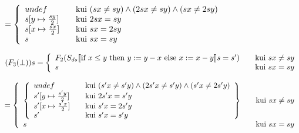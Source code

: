 \(
= 
\left\{
  \begin{array}{l l}
  undef                & \quad \text{kui}\ (sx \neq sy) \wedge (2sx \neq sy) \wedge (sx \neq 2sy)\\
  s[y \mapsto \frac{sy}{2} ] & \quad \text{kui}\ 2sx = sy \\
  s[x \mapsto \frac{sx}{2} ] & \quad \text{kui}\ sx = 2sy \\
  s                    & \quad \text{kui}\ sx = sy\\
  \end{array}
\right.
\)


\(
(F_3(\bot)) s = \left\{
    \begin{array}{l l}
    F_2(
      S_{ds} \llbracket
        \text{if\ } x \leq y
        \text{\ then\ } y := y - x \text{\ else\ } x := x - y
      \rrbracket s = s'
    ) & \quad \text{kui}\ sx \neq sy \\
    s & \quad \text{kui}\ sx = sy\\
  \end{array}
  \right.
\)

\(
=
\left\{
  \begin{array}{l l}
    \left \{ \begin{array}{l l}
      undef & \quad \text{kui}\ (s'x \neq s'y) \wedge (2s'x \neq s'y) \wedge (s'x \neq 2s'y)\\
      s'[y \mapsto \frac{s'y}{2} ] & \quad \text{kui}\ 2s'x = s'y \\
      s'[x \mapsto \frac{s'x}{2} ] & \quad \text{kui}\ s'x = 2s'y \\
      s'                    & \quad \text{kui}\ s'x = s'y\\
    \end{array} \right \} & \quad \text{kui}\ sx \neq sy \\
    s & \quad \text{kui}\ sx = sy\\
  \end{array}
  \right.
\)

